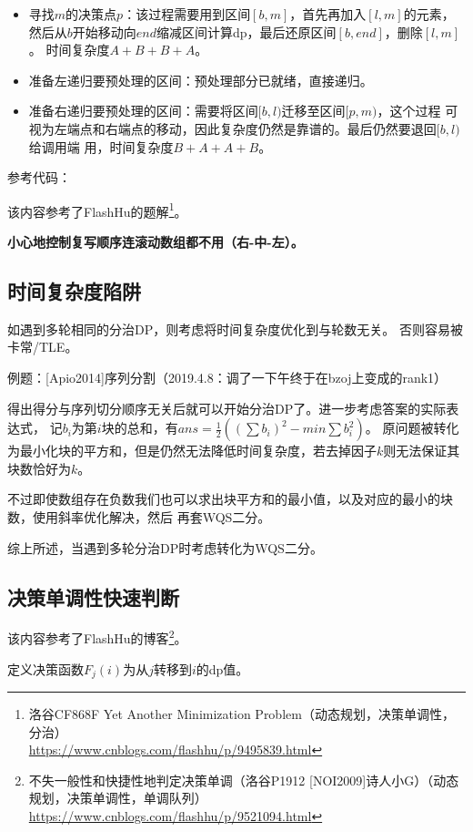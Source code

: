 \begin{itemize}
    \item 寻找$m$的决策点$p$：该过程需要用到区间$[b,m]$，首先再加入$[l,m]$的元素，
    然后从$b$开始移动向$end$缩减区间计算dp，最后还原区间$[b,end]$，删除$[l,m]$。
    时间复杂度$A+B+B+A$。
    \item 准备左递归要预处理的区间：预处理部分已就绪，直接递归。
    \item 准备右递归要预处理的区间：需要将区间$[b,l)$迁移至区间$[p,m)$，这个过程
    可视为左端点和右端点的移动，因此复杂度仍然是靠谱的。最后仍然要退回$[b,l)$给调用端
    用，时间复杂度$B+A+A+B$。
\end{itemize}

参考代码：


该内容参考了FlashHu的题解\footnote{
    洛谷CF868F Yet Another Minimization Problem（动态规划，决策单调性，分治）\\
    \url{https://www.cnblogs.com/flashhu/p/9495839.html}
}。

{\bfseries 小心地控制复写顺序连滚动数组都不用（右-中-左）。}

\subsection{时间复杂度陷阱}
如遇到多轮相同的分治DP，则考虑将时间复杂度优化到与轮数无关。
否则容易被卡常/TLE。

例题：[Apio2014]序列分割（2019.4.8：调了一下午终于在bzoj上变成的rank1）

得出得分与序列切分顺序无关后就可以开始分治DP了。进一步考虑答案的实际表达式，
记$b_i$为第$i$块的总和，有$ans=\frac{1}{2}\left(\left(\sum{b_i}\right)^2-min\sum{b_i^2}\right)$。
原问题被转化为最小化块的平方和，但是仍然无法降低时间复杂度，若去掉因子$k$则无法保证其块数恰好为$k$。

不过即使数组存在负数我们也可以求出块平方和的最小值，以及对应的最小的块数，使用斜率优化解决，然后
再套WQS二分。

综上所述，当遇到多轮分治DP时考虑转化为WQS二分。
\subsection{决策单调性快速判断}
该内容参考了FlashHu的博客\footnote{
    不失一般性和快捷性地判定决策单调（洛谷P1912 [NOI2009]诗人小G）（动态规划，决策单调性，单调队列）\\
    \url{https://www.cnblogs.com/flashhu/p/9521094.html}
}。

定义决策函数$F_j(i)$为从$j$转移到$i$的dp值。

